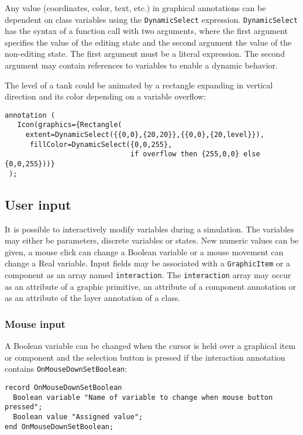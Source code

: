 Any value (coordinates, color, text, etc.) in graphical annotations can
be dependent on class variables using the \lstinline!DynamicSelect! expression.
\lstinline!DynamicSelect! has the syntax of a function call with two arguments,
where the first argument specifies the value of the editing state and
the second argument the value of the non-editing state. The first
argument must be a literal expression. The second argument may contain
references to variables to enable a dynamic behavior.

\begin{example}
The level of a tank could be animated by a
rectangle expanding in vertical direction and its color depending on a
variable overflow:
\begin{lstlisting}[language=modelica]
  annotation (
   Icon(graphics={Rectangle(
     extent=DynamicSelect({{0,0},{20,20}},{{0,0},{20,level}}),
      fillColor=DynamicSelect({0,0,255},
                              if overflow then {255,0,0} else {0,0,255}))}
 );
\end{lstlisting}
\end{example}

\subsection{User input}

It is possible to interactively modify variables during a simulation.
The variables may either be parameters, discrete variables or states.
New numeric values can be given, a mouse click can change a Boolean
variable or a mouse movement can change a Real variable. Input fields
may be associated with a \lstinline!GraphicItem! or a component as an array named
\lstinline!interaction!. The \lstinline!interaction! array may occur as an attribute of a
graphic primitive, an attribute of a component annotation or as an
attribute of the layer annotation of a class.

\subsubsection{Mouse input}

A Boolean variable can be changed when the cursor is held over a
graphical item or component and the selection button is pressed if the
interaction annotation contains \lstinline!OnMouseDownSetBoolean!:

\begin{lstlisting}[language=modelica]
record OnMouseDownSetBoolean
  Boolean variable "Name of variable to change when mouse button pressed";
  Boolean value "Assigned value";
end OnMouseDownSetBoolean;
\end{lstlisting}

